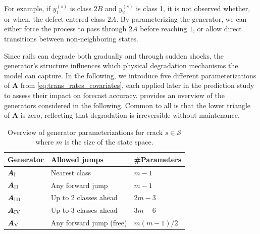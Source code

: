 For example, if $y_1^{(s)}$ is class $2B$ and $y_2^{(s)}$ is class 1, it is not observed whether, or when, the defect entered class $2A$. By parameterizing the generator, we can either force the process to pass through $2A$ before reaching $1$, or allow direct transitions between non-neighboring states. 

Since rails can degrade both gradually and through sudden shocks, the generator’s structure influences which physical degradation mechanisms the model can capture. In the following, we introduce five different parameterizations of $\bm{A}$ from \cref{eq:trans_rates_covariates}, each applied later in the prediction study to assess their impact on forecast accuracy.  provides an overview of the generators considered in the following. Common to all is that the lower triangle of $\bm{A}$ is zero, reflecting that degradation is irreversible without maintenance.

\begin{table}[htb!]
\centering
\caption{Overview of generator parameterizations for crack $s \in \mathcal{S}$ where $m$ is the size of the state space.}
\label{tab:generators_overview}
\begin{tabular}{@{}lll@{}}
\toprule
Generator & Allowed jumps & \#Parameters \\%
\midrule
$\bm{A}_{\RN{1}}$ & Nearest class & $m - 1$ \\%
$\bm{A}_{\RN{2}}$ & Any forward jump & $m - 1$ \\%
$\bm{A}_{\RN{3}}$ & Up to 2 classes ahead & $2m - 3$ \\%
$\bm{A}_{\RN{4}}$ & Up to 3 classes ahead & $3m - 6$ \\%
$\bm{A}_{\RN{5}}$ & Any forward jump (free) & $m(m-1)/2$ \\%
\bottomrule
\end{tabular}
\end{table}

\FloatBarrier

